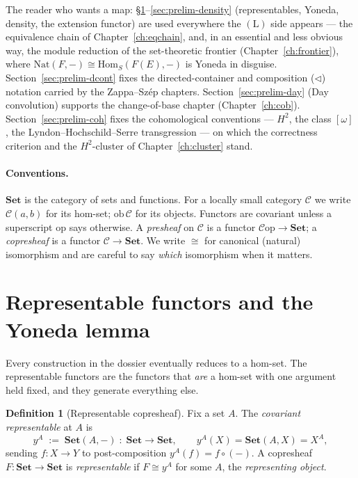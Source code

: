 \documentclass[11pt]{report}
\theoremstyle{plain}
\theoremstyle{definition}
\newtheorem{definition}[theorem]{Definition}
\theoremstyle{remark}
\newcommand{\Hcoh}{H^2}
\newcommand{\Hom}{\mathrm{Hom}}
\newcommand{\Nat}{\mathrm{Nat}}
\newcommand{\tri}{\triangleleft}
\newcommand{\op}{\mathrm{op}}
\newcommand{\Set}{\mathbf{Set}}
\newcommand{\yA}{y^{A}}
\newcommand{\ob}{\mathrm{ob}}
\newcommand{\iso}{\cong}
\begin{document}
The reader who wants a map: \S\ref{sec:prelim-yoneda}--\ref{sec:prelim-density}
(representables, Yoneda, density, the extension functor) are used everywhere the
$(\mathrm{L})$ side appears --- the equivalence chain of
Chapter~\ref{ch:eqchain}, and, in an essential and less obvious way, the module
reduction of the set-theoretic frontier (Chapter~\ref{ch:frontier}), where
$\Nat(F,-)\iso\Hom_S(F(E),-)$ is Yoneda in disguise. Section~\ref{sec:prelim-dcont}
fixes the directed-container and composition ($\tri$) notation carried by the
Zappa--Sz\'ep chapters. Section~\ref{sec:prelim-day} (Day convolution) supports
the change-of-base chapter (Chapter~\ref{ch:cob}). Section~\ref{sec:prelim-coh}
fixes the cohomological conventions --- $\Hcoh$, the class $[\omega]$, the
Lyndon--Hochschild--Serre transgression --- on which the correctness criterion and
the $\Hcoh$-cluster of Chapter~\ref{ch:cluster} stand.

\paragraph{Conventions.}
$\Set$ is the category of sets and functions. For a locally small category
$\mathcal C$ we write $\mathcal C(a,b)$ for its hom-set; $\ob\,\mathcal C$ for its
objects. Functors are covariant unless a superscript $\op$ says otherwise. A
\emph{presheaf} on $\mathcal C$ is a functor $\mathcal C\op\to\Set$; a
\emph{copresheaf} is a functor $\mathcal C\to\Set$. We write $\iso$ for canonical
(natural) isomorphism and are careful to say \emph{which} isomorphism when it
matters.

\section{Representable functors and the Yoneda lemma}
\label{sec:prelim-yoneda}

Every construction in the dossier eventually reduces to a hom-set. The
representable functors are the functors that \emph{are} a hom-set with one
argument held fixed, and they generate everything else.

\begin{definition}[Representable copresheaf]
\label{def:prelim-rep}
Fix a set $A$. The \emph{covariant representable} at $A$ is
\[
  \yA \;:=\; \Set(A,-)\;:\;\Set \longrightarrow \Set,
  \qquad
  \yA(X) = \Set(A,X) = X^{A},
\]
sending $f\colon X\to Y$ to post-composition $\yA(f)=f\circ(-)$. A copresheaf
$F\colon\Set\to\Set$ is \emph{representable} if $F\iso\yA$ for some $A$, the
\emph{representing object}.
\end{definition}
\end{document}
